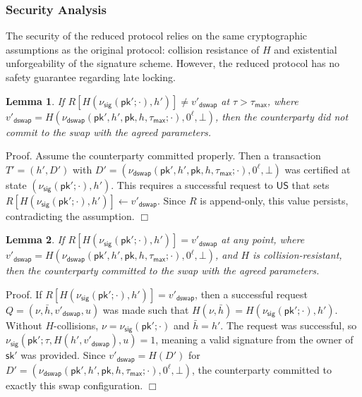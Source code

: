 \documentclass{article}
\newtheorem{lemma}{Lemma}[section]
\newenvironment{proof}{\textsf{Proof}.}{\hfill$\Box$}
\newcommand{\pubkey}[0]{\mathsf{pk}}
\newcommand{\prikey}[0]{\mathsf{sk}}
\newcommand{\unisrv}[0]{\mathsf{US}}
\begin{document}
\subsubsection{Security Analysis}

The security of the reduced protocol relies on the same cryptographic assumptions as the original protocol: collision resistance of $H$ and existential unforgeability of the signature scheme. However, the reduced protocol has no safety guarantee regarding late locking.

\begin{lemma}\label{le:dswap-rollback}
If $R[H(\nu_\mathsf{sig}(\pubkey';\cdot), h')] \neq v'_\mathsf{dswap}$ at $\tau > \tau_\mathsf{max}$, where \\
$v'_\mathsf{dswap} = H(\nu_\mathsf{dswap}(\pubkey', h', \pubkey, h, \tau_\mathsf{max};\cdot), 0^\ell, \bot)$, then the counterparty did not commit to the swap with the agreed parameters.
\end{lemma}
\begin{proof}
Assume the counterparty committed properly. Then a transaction $T' = (h', D')$ with $D' = (\nu_\mathsf{dswap}(\pubkey', h', \pubkey, h, \tau_\mathsf{max};\cdot), 0^\ell, \bot)$ was certified at state $(\nu_\mathsf{sig}(\pubkey';\cdot), h')$. This requires a successful request to $\unisrv$ that sets $R[H(\nu_\mathsf{sig}(\pubkey';\cdot), h')] \gets v'_\mathsf{dswap}$. Since $R$ is append-only, this value persists, contradicting the assumption.
\end{proof}

\begin{lemma}\label{le:dswap-success}
If $R[H(\nu_\mathsf{sig}(\pubkey';\cdot), h')] = v'_\mathsf{dswap}$ at any point, where \\
$v'_\mathsf{dswap} = H(\nu_\mathsf{dswap}(\pubkey', h', \pubkey, h, \tau_\mathsf{max};\cdot), 0^\ell, \bot)$, and $H$ is collision-resistant, then the counterparty committed to the swap with the agreed parameters.
\end{lemma}
\begin{proof}
If $R[H(\nu_\mathsf{sig}(\pubkey';\cdot), h')] = v'_\mathsf{dswap}$, then a successful request $Q = (\nu, \bar{h}, v'_\mathsf{dswap}, u)$ was made such that $H(\nu, \bar{h}) = H(\nu_\mathsf{sig}(\pubkey';\cdot), h')$. Without $H$-collisions, $\nu = \nu_\mathsf{sig}(\pubkey';\cdot)$ and $\bar{h} = h'$. The request was successful, so $\nu_\mathsf{sig}(\pubkey'; \tau, H(h', v'_\mathsf{dswap}), u) = 1$, meaning a valid signature from the owner of $\prikey'$ was provided. Since $v'_\mathsf{dswap} = H(D')$ for $D' = (\nu_\mathsf{dswap}(\pubkey', h', \pubkey, h, \tau_\mathsf{max};\cdot), 0^\ell, \bot)$, the counterparty committed to exactly this swap configuration.
\end{proof}
\end{document}
